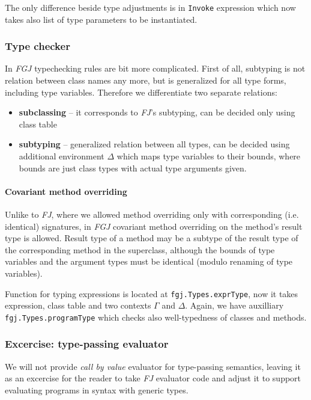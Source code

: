 \documentclass{article}[12pt]
\begin{document}
The only difference beside type adjustments is in \texttt{Invoke}
expression which now takes also list of type parameters to be
instantiated.

\subsubsection{Type checker}

In \emph{FGJ} typechecking rules are bit more complicated. First
of all, subtyping is not relation between class names any more,
but is generalized for all type forms, including type variables.
Therefore we differentiate two separate relations:

\begin{itemize}
\item{\textbf{subclassing}} -- it corresponds to \emph{FJ}'s
  subtyping, can be decided only using class table
\item{\textbf{subtyping}} -- generalized relation between all
  types, can be decided using additional environment $\Delta$
  which maps type variables to their bounds, where bounds are
  just class types with actual type arguments given.
\end{itemize}

\paragraph{Covariant method overriding}

Unlike to \emph{FJ}, where we allowed method overriding only with
corresponding (i.e. identical) signatures, in \emph{FGJ} covariant
method overriding on the method's result type is allowed. Result
type of a method may be a subtype of the result type of the
corresponding method in the superclass, although the bounds of
type variables and the argument types must be identical (modulo
renaming of type variables).

Function for typing expressions is located at
\texttt{fgj.Types.exprType}, now it takes expression, class table
and two contexts $\Gamma$ and $\Delta$. Again, we have auxilliary
\texttt{fgj.Types.programType} which checks also well-typedness of
classes and methods.

\subsubsection{Excercise: type-passing evaluator}

We will not provide \emph{call by value} evaluator for type-passing
semantics, leaving it as an excercise for the reader to take
\emph{FJ} evaluator code and adjust it to support evaluating
programs in syntax with generic types.
\end{document}
